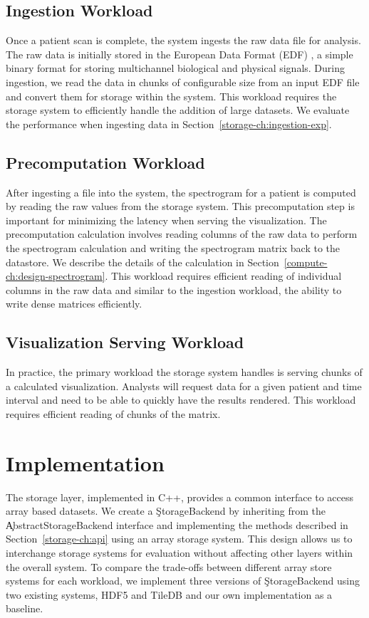 \subsection{Ingestion Workload}

Once a patient scan is complete, the system ingests the raw data file for
analysis. The raw data is initially stored in the European Data Format (EDF)
\cite{edf}, a simple binary format for storing multichannel biological and
physical signals. During ingestion, we read the data in chunks of configurable
size from an input EDF file and convert them for storage within the system.
This workload requires the storage system to efficiently handle the addition of
large datasets. We evaluate the performance when ingesting data in
Section~\ref{storage-ch:ingestion-exp}.

\subsection{Precomputation Workload}

After ingesting a file into the system, the spectrogram for a patient is
computed by reading the raw values from the storage system. This precomputation
step is important for minimizing the latency when serving the visualization.
The precomputation calculation involves reading columns of the raw data to
perform the spectrogram calculation and writing the spectrogram matrix back to
the datastore. We describe the details of the calculation in
Section~\ref{compute-ch:design-spectrogram}. This workload requires efficient
reading of individual columns in the raw data and similar to the ingestion
workload, the ability to write dense matrices efficiently.

\subsection{Visualization Serving Workload}

In practice, the primary workload the storage system handles is serving
chunks of a calculated visualization. Analysts will request data for a given
patient and time interval and need to be able to quickly have the results
rendered. This workload requires efficient reading of chunks of the matrix.

\section{Implementation}

The storage layer, implemented in C++, provides a common interface to access
array based datasets. We create a \c{StorageBackend} by inheriting from the
\c{AbstractStorageBackend} interface and implementing the methods described in
Section~\ref{storage-ch:api} using an array storage system. This design allows
us to interchange storage systems for evaluation without affecting other layers
within the overall system. To compare the trade-offs between different array
store systems for each workload, we implement three versions of
\c{StorageBackend} using two existing systems, HDF5 \cite{hdf5} and TileDB
\cite{tiledb} and our own implementation as a baseline. \\

